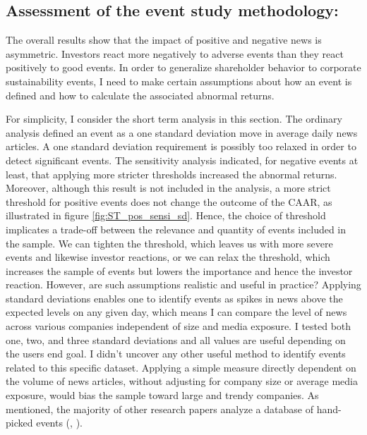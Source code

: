 
\subsection{Assessment of the event study methodology:}

The overall results show that the impact of positive and negative news is asymmetric. Investors react more negatively to adverse events than they react positively to good events. In order to generalize shareholder behavior to corporate sustainability events, I need to make certain assumptions about how an event is defined and how to calculate the associated abnormal returns. 

For simplicity, I consider the short term analysis in this section. The ordinary analysis defined an event as a one standard deviation move in average daily news articles. A one standard deviation requirement is possibly too relaxed in order to detect significant events. The sensitivity analysis indicated, for negative events at least, that applying more stricter thresholds increased the abnormal returns. Moreover, although this result is not included in the analysis, a more strict threshold for positive events does not change the outcome of the CAAR, as illustrated in figure \ref{fig:ST_pos_sensi_sd}. Hence, the choice of threshold implicates a trade-off between the relevance and quantity of events included in the sample. We can tighten the threshold, which leaves us with more severe events and likewise investor reactions, or we can relax the threshold, which increases the sample of events but lowers the importance and hence the investor reaction. However, are such assumptions realistic and useful in practice? Applying standard deviations enables one to identify events as spikes in news above the expected levels on any given day, which means I can compare the level of news across various companies independent of size and media exposure. I tested both one, two, and three standard deviations and all values are useful depending on the users end goal. I didn't uncover any other useful method to identify events related to this specific dataset. Applying a simple measure directly dependent on the volume of news articles, without adjusting for company size or average media exposure, would bias the sample toward large and trendy companies. As mentioned, the majority of other research papers analyze a database of hand-picked events (\cite{Blancard_ESG_sentiment}, \cite{kruger2015corporate}). 

